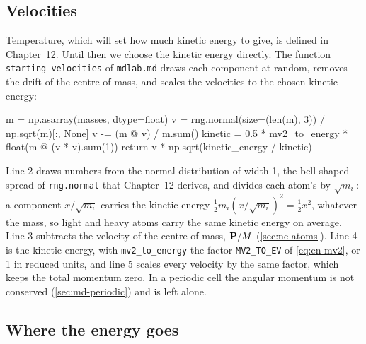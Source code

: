 \subsection*{Velocities}

Temperature, which will set how much kinetic energy to give, is defined in
Chapter~12. Until then we choose the kinetic energy directly. The function
\texttt{starting\_velocities} of \texttt{mdlab.md} draws each component at
random, removes the drift of the centre of mass, and scales the velocities
to the chosen kinetic energy:

\begin{code}
    m = np.asarray(masses, dtype=float)
    v = rng.normal(size=(len(m), 3)) / np.sqrt(m)[:, None]
    v -= (m @ v) / m.sum()
    kinetic = 0.5 * mv2_to_energy * float(m @ (v * v).sum(1))
    return v * np.sqrt(kinetic_energy / kinetic)
\end{code}

\noindent Line 2 draws numbers from the normal distribution of width 1,
the bell-shaped spread of \texttt{rng.normal} that Chapter~12 derives, and
divides each atom's by $\sqrt{m_i}$: a component $x/\sqrt{m_i}$ carries
the kinetic energy $\frac12m_i(x/\sqrt{m_i})^2 = \frac12x^2$, whatever the
mass, so light and heavy atoms carry the same kinetic energy on average.
Line 3 subtracts the velocity of the centre of mass, $\bm{\mathrm{P}}/M$
(\cref{sec:ne-atoms}). Line 4 is the kinetic energy, with
\texttt{mv2\_to\_energy} the factor \texttt{MV2\_TO\_EV} of
\cref{eq:en-mv2}, or 1 in reduced units, and line 5 scales every velocity by the same factor, which keeps the total
momentum zero. In a periodic cell the angular momentum is not conserved
(\cref{sec:md-periodic}) and is left alone.

\subsection*{Where the energy goes}

